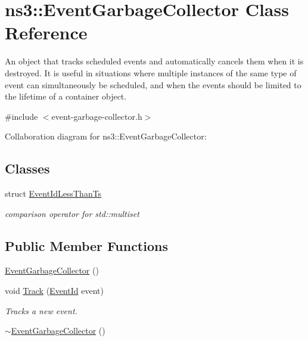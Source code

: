 \hypertarget{classns3_1_1EventGarbageCollector}{}\section{ns3\+:\+:Event\+Garbage\+Collector Class Reference}
\label{classns3_1_1EventGarbageCollector}


An object that tracks scheduled events and automatically cancels them when it is destroyed. It is useful in situations where multiple instances of the same type of event can simultaneously be scheduled, and when the events should be limited to the lifetime of a container object.  




{\ttfamily \#include $<$event-\/garbage-\/collector.\+h$>$}



Collaboration diagram for ns3\+:\+:Event\+Garbage\+Collector\+:
\subsection*{Classes}
\begin{DoxyCompactItemize}
\item 
struct \hyperlink{structns3_1_1EventGarbageCollector_1_1EventIdLessThanTs}{Event\+Id\+Less\+Than\+Ts}
\begin{DoxyCompactList}\small\item\em comparison operator for std\+::multiset \end{DoxyCompactList}\end{DoxyCompactItemize}
\subsection*{Public Member Functions}
\begin{DoxyCompactItemize}
\item 
\hyperlink{classns3_1_1EventGarbageCollector_aec55283c72c2c759481098de4c9d728f}{Event\+Garbage\+Collector} ()
\item 
void \hyperlink{classns3_1_1EventGarbageCollector_a4f26a1f6e9a09e648eb31b46acd85144}{Track} (\hyperlink{classns3_1_1EventId}{Event\+Id} event)
\begin{DoxyCompactList}\small\item\em Tracks a new event. \end{DoxyCompactList}\item 
\hyperlink{classns3_1_1EventGarbageCollector_ad77d417d7db0bf411456bc8f94bd2b90}{$\sim$\+Event\+Garbage\+Collector} ()
\end{DoxyCompactItemize}
